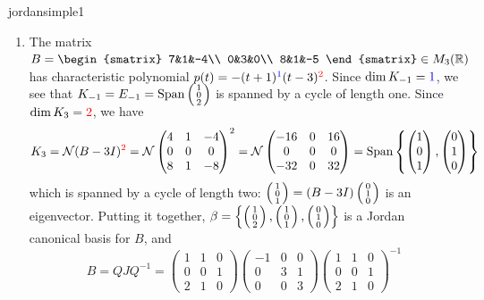 \begin{examples}{}{jordansimple1}
\begin{enumerate}
	  \item The matrix $B=
	  \begin{smatrix}
			7&1&-4\\
			0&3&0\\
			8&1&-5
		\end{smatrix}
		\in M_3(\R)$ has characteristic polynomial $p(t)=-(t+1)^{\textcolor{blue}1}(t-3)^{\textcolor{red}2}$.\smallbreak
		Since $\dim K_{-1}=\textcolor{blue}1$, we see that $K_{-1}=E_{-1}=\smash{\operatorname{Span}\left(\begin{smallmatrix}1\\0\\2\end{smallmatrix}\right)}$ is spanned by a cycle of length one.\smallbreak
	Since $\dim K_3=\textcolor{red}2$, we have
	  \[
	  	K_3=\mathcal{N}(B-3I)^{\textcolor{red}2}
	  	=\mathcal{N}
	  	\begin{pmatrix}
	  		4&1&-4\\
	  		0&0&0\\
	  		8&1&-8
	  	\end{pmatrix}
	  	^2=
	  	\mathcal{N}
	  	\begin{pmatrix}
	  		-16&0&16\\
	  		0&0&0\\
	  		-32&0&32
	  	\end{pmatrix}
	  	=\operatorname{Span}\left\{\begin{pmatrix}1\\0\\1\end{pmatrix},\begin{pmatrix}0\\1\\0\end{pmatrix}\right\}
	  \]
	  which is spanned by a cycle of length two: $\left(\begin{smallmatrix}1\\0\\1\end{smallmatrix}\right)=(B-3I)\left(\begin{smallmatrix}0\\1\\0\end{smallmatrix}\right)$ is an eigenvector.\smallbreak
	  Putting it together, $\beta=\left\{\left(\begin{smallmatrix}1\\0\\2\end{smallmatrix}\right),\left(\begin{smallmatrix}1\\0\\1\end{smallmatrix}\right),\left(\begin{smallmatrix}0\\1\\0\end{smallmatrix}\right)\right\}$ is a Jordan canonical basis for $B$, and
		\[
			B=QJQ^{-1}=
			\begin{pmatrix}
				1&1&0\\
				0&0&1\\
				2&1&0
			\end{pmatrix}
			\begin{pmatrix}
				-1&0&0\\
				0&3&1\\
				0&0&3
			\end{pmatrix}
			\begin{pmatrix}
				1&1&0\\
				0&0&1\\
				2&1&0
			\end{pmatrix}
			^{-1}
		\]
	 

\end{enumerate}
\end{examples}
